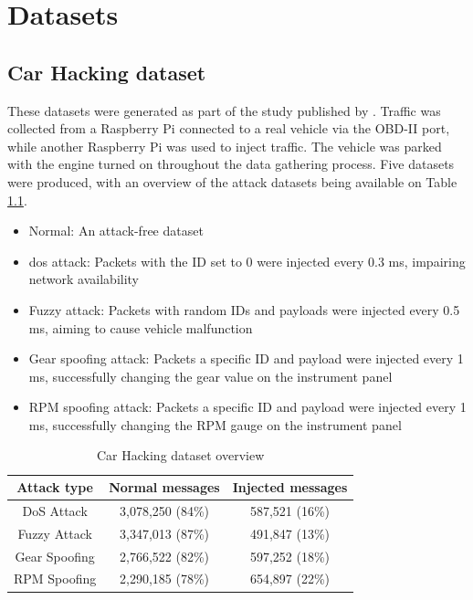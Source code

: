 \chapter{Datasets}
\label{c:datasets}

\section{Car Hacking dataset}

These datasets were generated as part of the study published by \cite{Song2020}. Traffic was collected from a Raspberry Pi connected to a real vehicle via the OBD-II port, while another Raspberry Pi was used to inject traffic. The vehicle was parked with the engine turned on throughout the data gathering process. Five datasets were produced, with an overview of the attack datasets being available on Table \ref{tab:car_hacking_dataset_overview}.

\begin{itemize}
    \item Normal: An attack-free dataset
    \item \gls{dos} attack: Packets with the ID set to 0 were injected every 0.3 ms, impairing network availability
    \item Fuzzy attack: Packets with random IDs and payloads were injected every 0.5 ms, aiming to cause vehicle malfunction
    \item Gear spoofing attack: Packets a specific ID and payload were injected every 1 ms, successfully changing the gear value on the instrument panel
    \item RPM spoofing attack: Packets a specific ID and payload were injected every 1 ms, successfully changing the RPM gauge on the instrument panel
\end{itemize}

\begin{table}
    \centering
    \begin{tabular}{*{3}{c}}
        \toprule
        \textbf{Attack type} & \textbf{Normal messages} & \textbf{Injected messages}\\
        \midrule
        DoS Attack & 3,078,250 (84\%) & 587,521 (16\%)\\
        Fuzzy Attack & 3,347,013 (87\%) & 491,847 (13\%)\\
        Gear Spoofing & 2,766,522 (82\%) & 597,252 (18\%)\\
        RPM Spoofing & 2,290,185 (78\%) & 654,897 (22\%)\\
        \bottomrule
    \end{tabular}
    \caption{Car Hacking dataset overview}
    \label{tab:car_hacking_dataset_overview}
\end{table}

